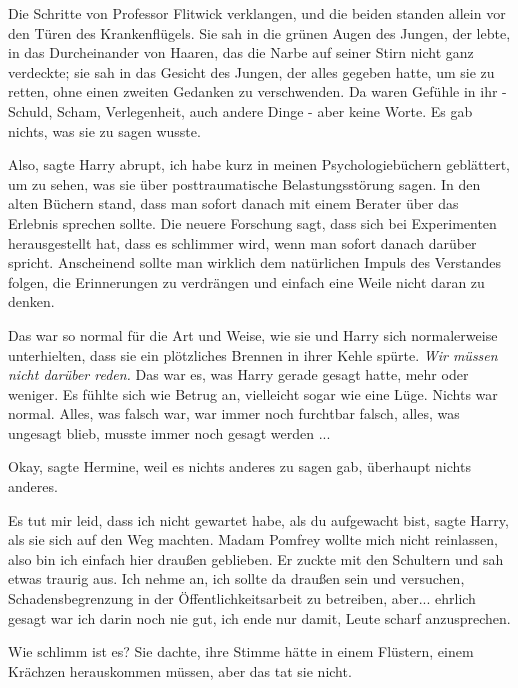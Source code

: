 Die Schritte von Professor Flitwick verklangen, und die beiden standen allein
vor den Türen des Krankenflügels. Sie sah in die grünen Augen des Jungen, der
lebte, in das Durcheinander von Haaren, das die Narbe auf seiner Stirn nicht
ganz verdeckte; sie sah in das Gesicht des Jungen, der alles gegeben hatte, um
sie zu retten, ohne einen zweiten Gedanken zu verschwenden. Da waren Gefühle in
ihr - Schuld, Scham, Verlegenheit, auch andere Dinge - aber keine Worte. Es gab
nichts, was sie zu sagen wusste.

\glqq{}Also\grqq{}, sagte Harry abrupt, \glqq{}ich habe kurz in meinen
Psychologiebüchern geblättert, um zu sehen, was sie über posttraumatische
Belastungsstörung sagen. In den alten Büchern stand, dass man sofort danach mit
einem Berater über das Erlebnis sprechen sollte. Die neuere Forschung sagt, dass
sich bei Experimenten herausgestellt hat, dass es schlimmer wird, wenn man
sofort danach darüber spricht. Anscheinend sollte man wirklich dem natürlichen
Impuls des Verstandes folgen, die Erinnerungen zu verdrängen und einfach eine
Weile nicht daran zu denken.\grqq{}

Das war so normal für die Art und Weise, wie sie und Harry sich normalerweise
unterhielten, dass sie ein plötzliches Brennen in ihrer Kehle spürte. \emph{Wir
müssen nicht darüber reden.} Das war es, was Harry gerade gesagt hatte, mehr
oder weniger. Es fühlte sich wie Betrug an, vielleicht sogar wie eine Lüge.
Nichts war normal. Alles, was falsch war, war immer noch furchtbar falsch,
alles, was ungesagt blieb, musste immer noch gesagt werden ...

\glqq{}Okay\grqq{}, sagte Hermine, weil es nichts anderes zu sagen gab, überhaupt
nichts anderes.

\glqq{}Es tut mir leid, dass ich nicht gewartet habe, als du aufgewacht
bist\grqq{}, sagte Harry, als sie sich auf den Weg machten. \glqq{}Madam Pomfrey
wollte mich nicht reinlassen, also bin ich einfach hier draußen
geblieben.\grqq{} Er zuckte mit den Schultern und sah etwas traurig aus. \glqq{}
Ich nehme an, ich sollte da draußen sein und versuchen, Schadensbegrenzung in
der Öffentlichkeitsarbeit zu betreiben, aber... ehrlich gesagt war ich darin
noch nie gut, ich ende nur damit, Leute scharf anzusprechen.\grqq{}

\glqq{}Wie schlimm ist es?\grqq{} Sie dachte, ihre Stimme hätte in einem
Flüstern, einem Krächzen herauskommen müssen, aber das tat sie nicht.


